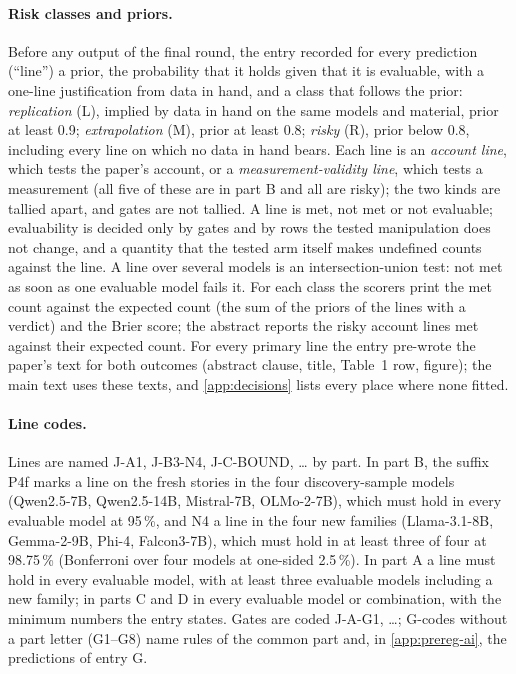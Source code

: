 \paragraph{Risk classes and priors.} Before any output of the final round, the entry recorded for every prediction (``line'') a prior, the probability that it holds given that it is evaluable, with a one-line justification from data in hand, and a class that follows the prior: \emph{replication} (L), implied by data in hand on the same models and material, prior at least 0.9; \emph{extrapolation} (M), prior at least 0.8; \emph{risky} (R), prior below 0.8, including every line on which no data in hand bears. Each line is an \emph{account line}, which tests the paper's account, or a \emph{measurement-validity line}, which tests a measurement (all five of these are in part B and all are risky); the two kinds are tallied apart, and gates are not tallied. A line is met, not met or not evaluable; evaluability is decided only by gates and by rows the tested manipulation does not change, and a quantity that the tested arm itself makes undefined counts against the line. A line over several models is an intersection-union test: not met as soon as one evaluable model fails it. For each class the scorers print the met count against the expected count (the sum of the priors of the lines with a verdict) and the Brier score; the abstract reports the risky account lines met against their expected count. For every primary line the entry pre-wrote the paper's text for both outcomes (abstract clause, title, Table~1 row, figure); the main text uses these texts, and \cref{app:decisions} lists every place where none fitted. %

\paragraph{Line codes.} Lines are named J-A1, J-B3-N4, J-C-BOUND, \ldots{} by part. In part B, the suffix P4f marks a line on the fresh stories in the four discovery-sample models (Qwen2.5-7B, Qwen2.5-14B, Mistral-7B, OLMo-2-7B), which must hold in every evaluable model at 95\,\%, and N4 a line in the four new families (Llama-3.1-8B, Gemma-2-9B, Phi-4, Falcon3-7B), which must hold in at least three of four at 98.75\,\% (Bonferroni over four models at one-sided 2.5\,\%). In part A a line must hold in every evaluable model, with at least three evaluable models including a new family; in parts C and D in every evaluable model or combination, with the minimum numbers the entry states. Gates are coded J-A-G1, \ldots; G-codes without a part letter (G1--G8) name rules of the common part and, in \cref{app:prereg-ai}, the predictions of entry G.

